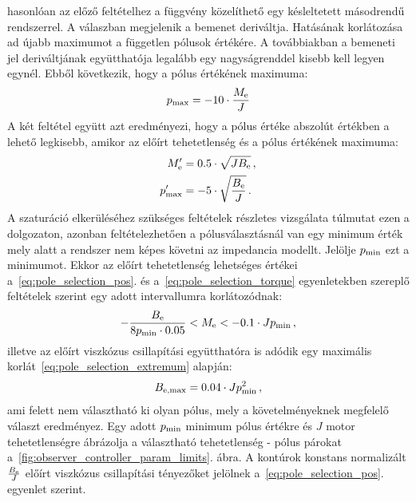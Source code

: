 hasonlóan az előző feltételhez a függvény közelíthető egy késleltetett másodrendű rendszerrel. A válaszban 
megjelenik a bemenet deriváltja. Hatásának korlátozása ad újabb maximumot a független pólusok értékére. A 
továbbiakban a bemeneti jel deriváltjának együtthatója legalább egy nagyságrenddel kisebb kell legyen egynél.
Ebből következik, hogy a pólus értékének maximuma:
\begin{align}\label{eq:pole_selection_torque}
    p_{\mathrm{max}} = -10 \cdot \frac{M_{\mathrm{e}}}{J}
\end{align}
A két feltétel együtt azt eredményezi, hogy a pólus értéke abszolút értékben a lehető legkisebb, amikor
az előírt tehetetlenség és a pólus értékének maximuma:
\begin{equation}\label{eq:pole_selection_extremum}
    \begin{split}
        M'_{\mathrm{e}} &= 0.5 \cdot \sqrt{JB_{\mathrm{e}}}\,, \\
        p'_{\mathrm{max}} &= -5 \cdot \sqrt{\frac{B_{\mathrm{e}}}{J}}\,.
    \end{split}
\end{equation}
A szaturáció elkerüléséhez szükséges feltételek részletes vizsgálata túlmutat ezen a dolgozaton, azonban feltételezhetően 
a pólusválasztásnál van egy minimum érték mely alatt a rendszer nem képes követni az impedancia modellt. Jelölje \(p_{\mathrm{min}}\) ezt a 
minimumot. Ekkor az előírt tehetetlenség lehetséges értékei a~\eqref{eq:pole_selection_pos}. és a~\eqref{eq:pole_selection_torque} 
egyenletekben szereplő feltételek szerint egy adott intervallumra korlátozódnak:
\begin{align}
    -\frac{B_{\mathrm{e}}}{8p_{\mathrm{min}} \cdot 0.05} < M_{\mathrm{e}} < -0.1 \cdot Jp_{\mathrm{min}}\,,
\end{align}
illetve az előírt viszkózus csillapítási együtthatóra is adódik egy maximális korlát~\eqref{eq:pole_selection_extremum} alapján:
\begin{align}
    B_{\mathrm{e,max}} = 0.04 \cdot Jp^2_{\mathrm{min}}\,,
\end{align}
ami felett nem választható ki olyan pólus, mely a követelményeknek megfelelő választ eredményez. 
Egy adott \(p_{\mathrm{min}}\) minimum pólus értékre és \(J\) motor tehetetlenségre ábrázolja 
a választható tehetetlenség - pólus párokat a~\ref{fig:observer_controller_param_limits}. ábra.
A kontúrok konstans normalizált \(\frac{B_{\mathrm{e}}}{J}\) előírt viszkózus csillapítási tényezőket jelölnek a~\eqref{eq:pole_selection_pos}.
egyenlet szerint.

